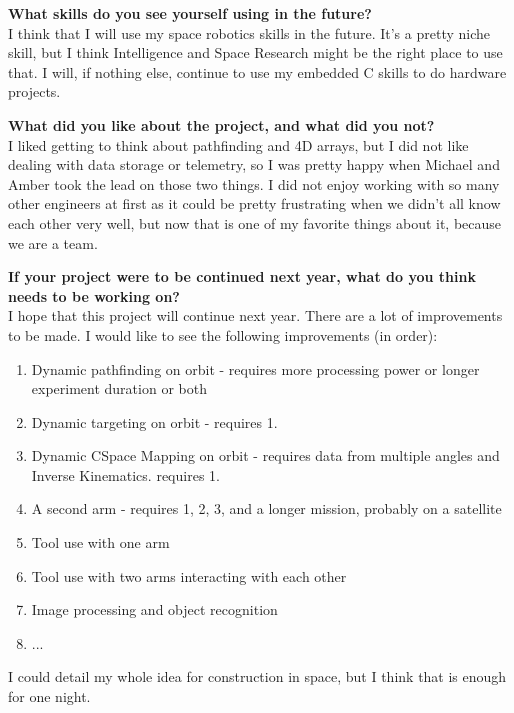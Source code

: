 \textbf{What skills do you see yourself using in the future?} \\ 
I think that I will use my space robotics skills in the future. It's a pretty niche skill, but I think Intelligence and Space Research might be the right place to use that. I will, if nothing else, continue to use my embedded C skills to do hardware projects.

\textbf{What did you like about the project, and what did you not?} \\ 
I liked getting to think about pathfinding and 4D arrays, but I did not like dealing with data storage or telemetry, so I was pretty happy when Michael and Amber took the lead on those two things. I did not enjoy working with so many other engineers at first as it could be pretty frustrating when we didn't all know each other very well, but now that is one of my favorite things about it, because we are a team.

\textbf{If your project were to be continued next year, what do you think needs to be working on?} \\ 
I hope that this project will continue next year. There are a lot of improvements to be made. I would like to see the following improvements (in order):

\begin{enumerate}
\item{Dynamic pathfinding on orbit - requires more processing power or longer experiment duration or both}
\item{Dynamic targeting on orbit - requires 1.}
\item{Dynamic CSpace Mapping on orbit - requires data from multiple angles and Inverse Kinematics. requires 1.}
\item{A second arm - requires 1, 2, 3, and a longer mission, probably on a satellite}
\item{Tool use with one arm}
\item{Tool use with two arms interacting with each other}
\item{Image processing and object recognition}
\item{...}
\end{enumerate}
I could detail my whole idea for construction in space, but I think that is enough for one night.


